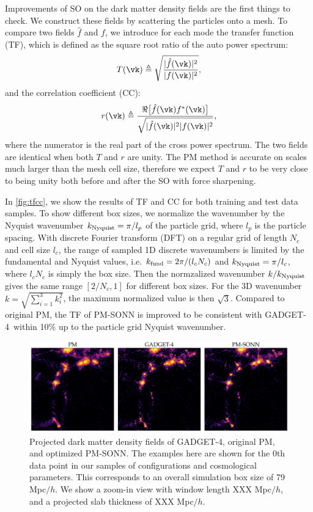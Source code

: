 \documentclass[modern, trackchanges, dvipsnames]{aastex631}
\newcommand{\GADGET}{{{\fontsize{10pt}{12pt}\selectfont GADGET}-4}}
\begin{document}
Improvements of SO on the dark matter density fields are the first
things to check.
We construct these fields by scattering the particles onto a mesh.
To compare two fields $\hat f$ and $f$, we introduce for each mode the
transfer function (TF), which is defined as the square root ratio of the
auto power spectrum:
%
\begin{equation}
T(\vk) \triangleq
\sqrt{\frac{|\hat f(\vk)|^2}{|f(\vk)|^2}},
\label{T}
\end{equation}
%
and the correlation coefficient (CC):
%
\begin{equation}
r(\vk) \triangleq
\frac{\Re \bigl[ \hat f(\vk) f^*(\vk) \bigr]}
     {\sqrt{|\hat f(\vk)|^2 |f(\vk)|^2}},
\label{r}
\end{equation}
%
where the numerator is the real part of the cross power spectrum.
The two fields are identical when both $T$ and $r$ are unity.
The PM method is accurate on scales much larger than the mesh cell size,
therefore we expect $T$ and $r$ to be very close to being unity both
before and after the SO with force sharpening.

In \autoref{fig:tfcc}, we show the results of TF and CC for both
training and test data samples.
To show different box sizes, we normalize the wavenumber by the Nyquist
wavenumber $k_{\rm Nyquist} = \pi / l_p$ of the particle grid, where
$l_p$ is the particle spacing.
With discrete Fourier transform (DFT) on a regular grid of length $N_c$
and cell size $l_c$, the range of sampled 1D discrete wavenumbers is
limited by the fundamental and Nyquist values, i.e. $k_{\rm fund} =
2\pi/(l_c N_c)$ and $k_{\rm Nyquist} = \pi/l_c$, where $l_c N_c$ is
simply the box size.
Then the normzalized wavenumber $k/k_{\rm Nyquist}$ gives the same range
$[2/N_c, 1]$ for different box sizes.
For the 3D wavenumber $k=\sqrt{\sum_{i=1}^{3}k_i^2}$, the maximum
normalized value is then $\sqrt{3}$.
Compared to original PM, the TF of PM-SONN is improved to be consistent
with \GADGET\ within 10\% up to the particle grid Nyquist wavenumber.



\begin{figure}
  \centering
  \includegraphics[width=.98\columnwidth]{slab_s0_snap120_3177874_e3000.pdf}
  \caption{Projected dark matter density fields of \GADGET, original PM,
  and optimized PM-SONN.
  The examples here are shown for the 0th data point in our samples of
  configurations and cosmological parameters.
  This corresponds to an overall simulation box size of 79 Mpc$/h$.
  We show a zoom-in view with window length XXX Mpc$/h$, and a projected
  slab thickness of XXX Mpc$/h$.}
  \label{fig:denslab}
\end{figure}
\end{document}
